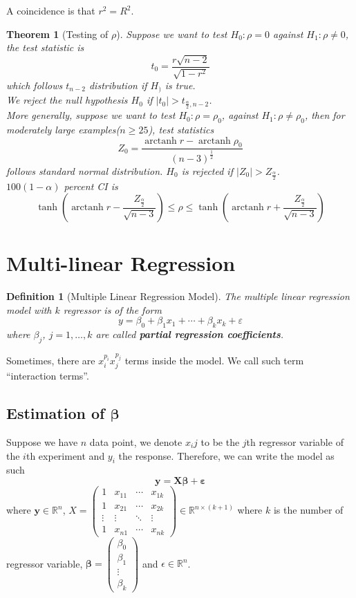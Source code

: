 \documentclass[11pt]{article}
\newtheorem{definition}{Definition}[section]
\newtheorem{theorem}{Theorem}[section]
\theoremstyle{definition}
\DeclareMathOperator{\arctanh}{arctanh}
\begin{document}
A coincidence is that $r^2 = R^2$.\\
\begin{theorem}[Testing of {$\rho$}]
\normalfont 
Suppose we want to test $H_0:\rho = 0$ against $H_1:\rho\neq 0$, the test statistic is
\[
t_0 = \frac{r\sqrt{n-2}}{\sqrt{1-r^2}}
\]
which follows $t_{n-2}$ distribution if $H_)$ is true.\\
We reject the null hypothesis $H_0$ if $|t_0|>t_{\frac{\alpha}{2}, n-2}$.\\

More generally, suppose we want to test $H_0: \rho = \rho_0$, against $H_1:\rho\neq \rho_0$, then for \textit{moderately large examples}($n\geq 25$), test statistics
\[
Z_0 = \frac{\arctanh r- \arctanh \rho_0}{(n-3)^{\frac{1}{2}}}
\]
follows standard normal distribution. $H_0$ is rejected if $|Z_0|>Z_{\frac{\alpha}{2}}$.\\
$100(1-\alpha)$ percent CI is
\[
\tanh(\arctanh r-\frac{Z_{\frac{\alpha}{2}}}{\sqrt{n-3}})\leq \rho\leq \tanh(\arctanh r+\frac{Z_{\frac{\alpha}{2}}}{\sqrt{n-3}})
\]
\end{theorem}
\section{Multi-linear Regression}
\begin{definition}[Multiple Linear Regression Model]
\normalfont The multiple linear regression model with $k$ regressor is of the form
\[
y=\beta_0+\beta_1x_1+\cdots+\beta_kx_k+\varepsilon
\]
where $\beta_j$, $j=1,\ldots, k$ are called \textbf{partial regression coefficients}.
\end{definition}
Sometimes, there are $x_i^{p_i}x_j^{p_j}$ terms inside the model. We call such term ``interaction terms''. 

\subsection{Estimation of {$\bm{\beta}$}}
Suppose we have $n$ data point, we denote $x_ij$ to be the $j$th regressor variable of the $i$th experiment and $y_i$ the response. Therefore, we can write the model as such
\[
\bm{y}=\bm{X\beta}+\bm{\varepsilon}
\]
where $\bm{y}\in\mathbb{R}^n$, $X=\begin{pmatrix} 1&x_{11}&\cdots&x_{1k}\\1&x_{21}&\cdots&x_{2k}\\\vdots&\vdots&\ddots&\vdots\\1&x_{n1}&\cdots&x_{nk}\end{pmatrix}\in\mathbb{R}^{n\times (k+1)}$ where $k$ is the number of regressor variable, $\bm{\beta}=\begin{pmatrix} \beta_0\\\beta_1\\\vdots\\\beta_k\end{pmatrix}$ and $\epsilon\in \mathbb{R}^n$.\\
\end{document}
